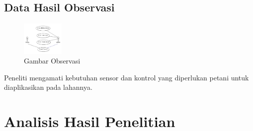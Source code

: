 \begin{flushleft}
\begin{justify}
    \end{justify}




    
    \subsection{Data Hasil Observasi}
\vspace{5cm}
\begin{figure}[ht]
	\centering
	\includegraphics[width=2cm]{images/UseCaseDiagramSistemSaatIni}
	\caption{Gambar Observasi}
\end{figure}
Peneliti mengamati kebutuhan sensor dan kontrol yang diperlukan petani untuk diaplikasikan pada lahannya. 
    \section{Analisis Hasil Penelitian}

\end{flushleft}

\newpage